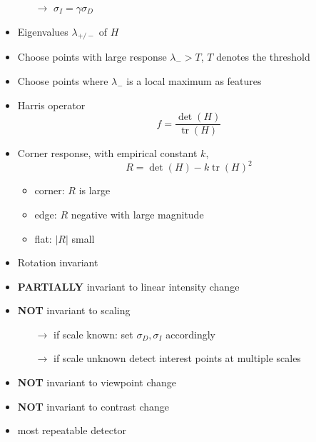 \documentclass[12pt]{article}
\DeclareMathOperator*{\tr}{tr}
\begin{document}
\begin{itemize}
		\begin{itemize}
			\item[$\rightarrow$] $\sigma_I = \gamma \sigma_D$
		\end{itemize}
		\item Eigenvalues $\lambda_{+/-}$ of $H$
		\item Choose points with large response $\lambda_{-} > T$, $T$ denotes the threshold
		\item Choose points where $\lambda_{-}$ is a local maximum as features
		\item Harris operator
		\begin{equation}
		f = \frac{\det(H)}{\tr(H)}
		\end{equation}
		\item Corner response, with empirical constant $k$,
		\begin{equation}
		R = \det(H) - k \tr(H)^2
		\end{equation}
		\begin{itemize}
			\item corner: $R$ is large
			\item edge: $R$ negative with large magnitude
			\item flat: $|R|$ small
		\end{itemize}
		\item Rotation invariant
		\item \textbf{PARTIALLY} invariant to linear intensity change
		\item \textbf{NOT} invariant to scaling
			\begin{itemize}
				\item[$\rightarrow$] if scale known: set $\sigma_D, \sigma_I$ accordingly
				\item[$\rightarrow$] if scale unknown detect interest points at multiple scales
			\end{itemize}
		\item \textbf{NOT} invariant to viewpoint change
		\item \textbf{NOT} invariant to contrast change
		\item most repeatable detector
		
	\end{itemize}
\end{document}
